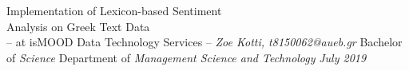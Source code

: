 \documentclass[dvips, letterpaper, 12pt]{report}
\begin{document}
\sloppy


\thesistitle
	{Implementation of Lexicon-based Sentiment \\
	\vspace{3mm}
	 Analysis on Greek Text Data \\
	\vspace{1cm}
	 -- at isMOOD Data Technology Services --}
	{\emph{Zoe Kotti, t8150062@aueb.gr}}
	{Bachelor of \emph{Science}}
	{Department of \emph{Management Science and Technology}}
	{\emph{July 2019}}




\tableofcontents













\appendix

\end{document}
